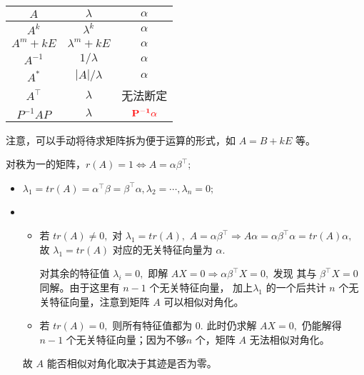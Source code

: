 \begin{table}[!htbp]\centering
    \begin{tabular}{ccc}
    \toprule
    $A        $&$ \lambda      $& $\alpha                  $ \\ \midrule
    $A^k      $&$ \lambda^k    $& $\alpha                  $ \\
    $A^m+kE   $&$ \lambda^m+kE $& $\alpha                  $ \\
    $A^{-1}   $&$ 1 /\lambda   $& $\alpha                  $ \\
    $A^*      $&$ |A|/\lambda  $& $\alpha                  $ \\
    $A^\top   $&$ \lambda      $&  无法断定                   \\
    $P^{-1}AP $&$ \lambda      $& $\textcolor{red}{\bf{P^{-1}\alpha}}$ \\ \bottomrule
    \end{tabular}
\end{table}

注意，可以手动将待求矩阵拆为便于运算的形式，如 $ A = B + kE $ 等。


对秩为一的矩阵，$ r(A) = 1\Leftrightarrow A = \alpha\beta^\top; $ 
\begin{itemize}
    \item $ \lambda_1 = tr(A) = \alpha^\top\beta = \beta^\top\alpha, \lambda_2 = \cdots,\lambda_n = 0; $ 
    \item \begin{itemize}
        \item 若 $ tr(A)\neq 0, $ 对 $ \lambda_1 = tr(A), $ 
        $ A = \alpha\beta^\top \Rightarrow A\alpha = \alpha\beta^\top\alpha = tr(A)\alpha, $ 
        故 $ \lambda_1 = tr(A) $ 对应的无关特征向量为 $ \alpha. $ 

        对其余的特征值 $ \lambda_i = 0, $ 即解 $ AX = 0 \Rightarrow \alpha\beta^\top X = 0, $ 发现
        其与 $ \beta^\top X = 0 $ 同解。由于这里有 $ n - 1 $ 个无关特征向量，
        加上$ \lambda_1 $ 的一个后共计 $ n $ 个无关特征向量，注意到矩阵 $ A $ 可以相似对角化。

        \item 若 $ tr(A) = 0, $ 则所有特征值都为 $ 0. $ 此时仍求解 $ AX = 0, $ 
        仍能解得 $ n - 1 $ 个无关特征向量；因为不够$ n $ 个，矩阵 $ A $ 无法相似对角化。
    \end{itemize}
    故 $ A $ 能否相似对角化取决于其迹是否为零。
\end{itemize}

